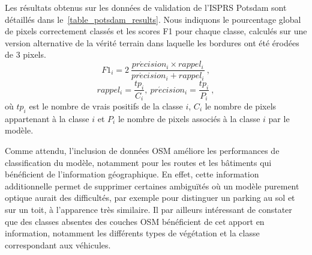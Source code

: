 Les résultats obtenus sur les données de validation de l'ISPRS Potsdam sont détaillés dans le~\cref{table_potsdam_results}. Nous indiquons le pourcentage global de pixels correctement classés et les scores F1 pour chaque classe, calculés sur une version alternative de la vérité terrain dans laquelle les bordures ont été érodées de 3 pixels.
\begin{equation}
F1_{i} = 2~\frac{pr\acute{e}cision_{i} \times rappel_{i}}{pr\acute{e}cision_{i} + rappel_{i}}~,
\end{equation}
\begin{equation}
rappel_i = \frac{tp_i}{C_i},~ pr\acute{e}cision_i = \frac{tp_i}{P_i}~,
\end{equation}
où $tp_i$ est le nombre de vrais positifs de la classe $i$, $C_i$ le nombre de pixels appartenant à la classe $i$ et $P_i$ le nombre de pixels associés à la classe $i$ par le modèle.

Comme attendu, l'inclusion de données OSM améliore les performances de classification du modèle, notamment pour les routes et les bâtiments qui bénéficient de l'information géographique. En effet, cette information additionnelle permet de supprimer certaines ambiguïtés où un modèle purement optique aurait des difficultés, par exemple pour distinguer un parking au sol et sur un toit, à l'apparence très similaire. Il par ailleurs intéressant de constater que des classes absentes des couches \gls{OSM} bénéficient de cet apport en information, notamment les différents types de végétation et la classe correspondant aux véhicules.

